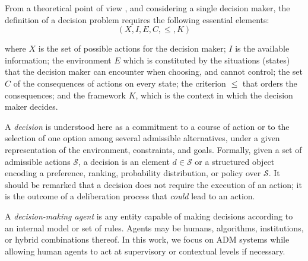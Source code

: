 \documentclass[letterpaper, 10 pt,conference]{IEEEconf}
\begin{document}
From a theoretical point of view \cite{LamataPeltaVerdegay2020}, and considering a single decision maker, the definition of a decision problem requires the following essential elements:
$$(X, I, E,C,\leq, K)$$

\noindent
where $X$ is the set of possible actions for the decision maker; $I$ is the available information; the environment $E$ which is constituted by the situations (states) that the decision maker can encounter when choosing, and cannot control; the set $C$ of the consequences of actions on every state; the criterion $\leq$ that orders the consequences; and the framework $K$, which is the context in which the decision maker decides.

A \textit{decision} is understood here as a commitment to a course of action or to the selection of one option among several admissible alternatives, under a given representation of the environment, constraints, and goals. Formally, given a set of admissible actions $\mathcal{S}$, a decision is an element $d \in \mathcal{S}$ or a structured object encoding a preference, ranking, probability distribution, or policy over $\mathcal{S}$. 
It should be remarked that a decision does not require the execution of an action; it is the outcome of a deliberation process that \emph{could} lead to an action.

A \textit{decision-making agent} is any entity capable of making decisions according to an internal model or set of rules. Agents may be humans, algorithms, institutions, or hybrid combinations thereof. In this work, we focus on ADM systems while allowing human agents to act at supervisory or contextual levels if necessary.
\end{document}
